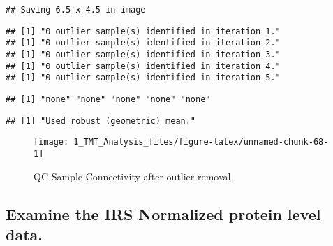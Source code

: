 \documentclass[]{article}
\begin{document}
\begin{verbatim}
## Saving 6.5 x 4.5 in image
\end{verbatim}

\begin{verbatim}
## [1] "0 outlier sample(s) identified in iteration 1."
## [1] "0 outlier sample(s) identified in iteration 2."
## [1] "0 outlier sample(s) identified in iteration 3."
## [1] "0 outlier sample(s) identified in iteration 4."
## [1] "0 outlier sample(s) identified in iteration 5."
\end{verbatim}

\begin{verbatim}
## [1] "none" "none" "none" "none" "none"
\end{verbatim}

\begin{verbatim}
## [1] "Used robust (geometric) mean."
\end{verbatim}

\begin{figure}

{\centering \texttt{[image: 1\_TMT\_Analysis\_files/figure-latex/unnamed-chunk-68-1]} 

}

\caption{QC Sample Connectivity after outlier removal.}\label{fig:unnamed-chunk-68}
\end{figure}

\subsection{Examine the IRS Normalized protein level
data.}\label{examine-the-irs-normalized-protein-level-data.}
\end{document}
